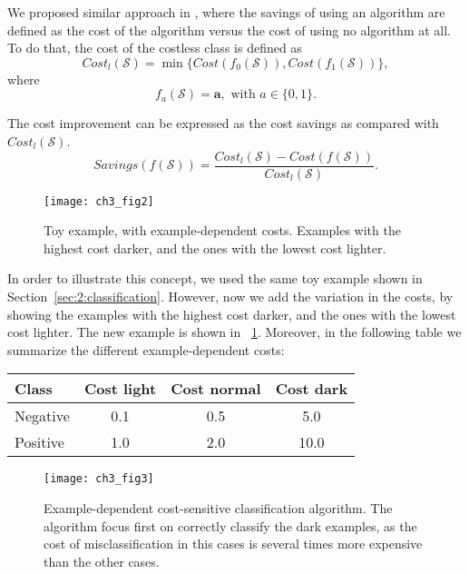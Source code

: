 {{  We proposed similar approach in \citep{CorreaBahnsen2014b}, where the savings of using an 
  algorithm  are defined as the cost of the algorithm versus the cost of using no algorithm at all. 
  To do that, the cost of the costless class is defined as 
  \begin{equation}
    Cost_l(\mathcal{S}) = \min \{Cost(f_0(\mathcal{S})), Cost(f_1(\mathcal{S}))\},
  \end{equation}
  where 
  \begin{equation}\label{eq:3:f_a}
    f_a(\mathcal{S}) = \mathbf{a}, \text{ with } a\in \{0,1\}.
  \end{equation}

  The cost improvement can be expressed as the cost savings as compared with $Cost_l(\mathcal{S})$. 
  \begin{equation}\label{eq:3:savings}
    Savings(f(\mathcal{S})) = \frac{ Cost_l(\mathcal{S}) - Cost(f(\mathcal{S}))}
    {Cost_l(\mathcal{S})}.
  \end{equation} 

\begin{figure}[t!]
  \centering
  \texttt{[image: ch3\_fig2]}
  \caption{Toy example, with example-dependent costs. Examples with the highest cost darker, and 
the   ones with the lowest cost lighter.}
  \label{fig:3:2}
\end{figure}

In order to illustrate this concept, we used the same toy example shown in 
Section~\ref{sec:2:classification}. However, now we add the variation in the costs, by showing the 
examples with the highest cost darker, and the ones with the lowest cost lighter. The new example 
is shown in \figurename{~\ref{fig:3:2}}. Moreover, in the following table we summarize the 
different example-dependent costs:
  \begin{center}
    \footnotesize
  \begin{tabular}{l|c|c|c}
  Class & Cost light & Cost normal & Cost dark \\
  \hline
    Negative & 0.1 & 0.5 & 5.0 \\
    Positive & 1.0 & 2.0 & 10.0 \\
  \end{tabular}
  \end{center}
  
\begin{figure}[t!]
  \centering
  \texttt{[image: ch3\_fig3]}
  \caption{Example-dependent cost-sensitive classification algorithm. The algorithm focus first on 
correctly classify the dark examples, as the cost of misclassification in this cases is 
several times more expensive than the other cases.}
  \label{fig:3:3}
\end{figure}

}}
